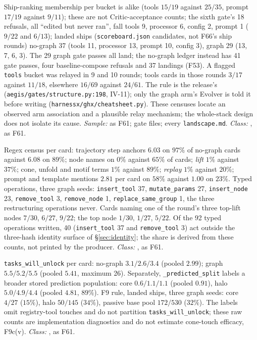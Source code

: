 \begin{description}[leftmargin=0pt,labelindent=0pt,labelsep=0pt,style=nextline,font=\normalfont,itemsep=6pt]
\item[\textbf{F62}\quad Where the bucket shift sits: written, not filtered.]
Ship-ranking membership per bucket is alike (tools $15/19$ against $25/35$,
prompt $17/19$ against $9/11$); these are not Critic-acceptance counts; the sixth gate's 18 refusals, all ``edited but
never ran'', fall tools 9, processor 6, config 2, prompt 1 ($9/22$ and
$6/13$); landed ships (\texttt{scoreboard.json} candidates, not F66's
ship rounds) no-graph 37 (tools 11, processor 13, prompt 10, config 3),
graph 29 (13, 7, 6, 3). The 29 graph gate passes all land; the no-graph
ledger instead has 41 gate passes, four baseline-compose refusals and 37
landings (F53). A flagged \texttt{tools} bucket was
relayed in 9 and 10 rounds; tools cards in those rounds $3/17$ against
$11/18$, elsewhere $16/69$ against $24/61$. The rule is the release's
(\texttt{aegis/gates/structure.py:198}, IV-11); only the graph arm's
Evolver is told it before writing (\texttt{harnessx/ghx/cheatsheet.py}).
These censuses locate an observed arm association and a plausible relay
mechanism; the whole-stack design does not isolate its cause.
\emph{Sample:} as F61; gate files; every \texttt{landscape.md}.
\emph{Class:} , as F61.

\item[\textbf{F63}\quad What the cards cite; the operations written.]
Regex census per card: trajectory step anchors $6.03$ on $97\%$ of no-graph
cards against $6.08$ on $89\%$; node names on $0\%$ against $65\%$ of cards;
\emph{lift} $1\%$ against $37\%$; cone, unfold and motif terms $1\%$ against
$89\%$; \emph{replay} $1\%$ against $20\%$; prompt and template mentions
$2.81$ per card on $58\%$ against $1.00$ on $23\%$. Typed operations, three
graph seeds: \texttt{insert\_tool} 37, \texttt{mutate\_params} 27,
\texttt{insert\_node} 23, \texttt{remove\_tool} 3, \texttt{remove\_node} 1,
\texttt{replace\_same\_group} 1, the three restructuring operations never.
Cards naming one of the round's three top-lift nodes $7/30$, $6/27$, $9/22$;
the top node $1/30$, $1/27$, $5/22$. Of the 92 typed operations written,
40 (\texttt{insert\_tool} 37 and \texttt{remove\_tool} 3) act outside the
three-hash identity surface of \S\ref{sec:identity}; the share is derived
from these counts, not printed by the producer. \emph{Class:} , as F61.

\item[\textbf{F64}\quad Predictions per card; core against halo.]
\texttt{tasks\_will\_unlock} per card: no-graph $3.1/2.6/3.4$ (pooled
$2.99$); graph $5.5/5.2/5.5$ (pooled $5.41$, maximum 26). Separately,
\texttt{\_predicted\_split} labels a broader stored prediction population:
core $0.6/1.1/1.1$ (pooled $0.91$), halo $5.0/4.9/4.4$ (pooled $4.81$,
$89\%$). F9 rule, landed ships, three graph seeds: core $4/27$ ($15\%$),
halo $50/145$ ($34\%$), passive base pool $172/530$ ($32\%$). The labels
omit registry-tool touches and do not partition \texttt{tasks\_will\_unlock};
these raw counts are implementation diagnostics and do not estimate
cone-touch efficacy, F9c(v). \emph{Class:}
, as F61.


\end{description}
